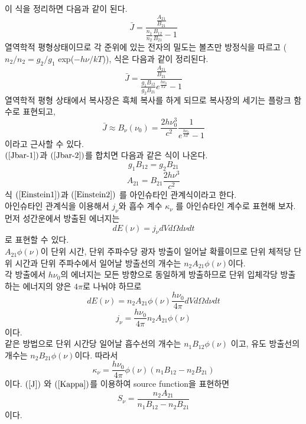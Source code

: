 이 식을 정리하면 다음과 같이 된다. 
\begin{equation}
\bar{J} = \frac{\frac{A_{21}}{B_{21}}}{\frac{n_1}{n_2}\frac{B_{12}}{B_{21}}-1}
\end{equation}
열역학적 평형상태이므로 각 준위에 있는 전자의 밀도는 볼츠만 방정식을 따르고 ($n_2/n_2 = g_2/g_1$ exp($-h\nu/kT$)), 식은 다음과 같이 정리된다. 
\begin{equation}
\bar{J} = \frac{\frac{A_{21}}{B_{21}}}{\frac{g_1 B_{12}}{g_2 B_{21}}e^{\frac{h \nu_0}{kT}}-1} \label{Jbar-1}
\end{equation}
열역학적 평형 상태에서 복사장은 흑체 복사를 하게 되므로 복사장의 세기는 플랑크 함수로 표현되고, 
\begin{equation}
\bar{J} \approx B_\nu (\nu_0) = \frac{2h\nu_0^3}{c^2} \frac{1}{e^{\frac{h\nu_0}{kT}}-1} \label{Jbar-2}
\end{equation}이라고 근사할 수 있다.\\
$(\ref{Jbar-1})$과 $(\ref{Jbar-2})$를 합치면 다음과 같은 식이 나온다. 
\begin{equation}
g_1 B_{12} = g_2 B_{21} \label{Einstein1}
\end{equation}
\begin{equation}
A_{21} = B_{21}\frac{2h\nu^3}{c^2}  \label{Einstein2}
\end{equation}
식 $(\ref{Einstein1})$과 $(\ref{Einstein2})$ 를 아인슈타인 관계식이라고 한다. \\
아인슈타인 관계식을 이용해서 $j_\nu$와 흡수 계수 $\kappa_\nu$ 를 아인슈타인 계수로 표현해 보자.\\
먼저 성간운에서 방출된 에너지는 
\begin{equation}
dE(\nu) = j_\nu dV d\Omega d\nu dt %
\end{equation}
로 표현할 수 있다. \\
$A_{21}\phi(\nu)$이 단위 시간, 단위 주파수당 광자 방출이 일어날 확률이므로 단위 체적당 단위 시간과 단위 주파수에서 일어날 방출선의 개수는 $n_2 A_{21} \phi(\nu)$이다. \\
각 방출에서 $h\nu_0$의 에너지는 모든 방향으로 동일하게 방출하므로 단위 입체각당 방출하는 에너지의 양은 $4\pi$로 나눠야 하므로\\
\begin{equation}
dE(\nu) = n_2 A_{21} \phi(\nu) \frac{h \nu_0}{4\pi} dV d\Omega d\nu dt %
\end{equation}
\begin{equation}
j_\nu = \frac{h\nu_0}{4\pi} n_2 A_{21} \phi(\nu) \label{J}
\end{equation}
이다. \\
같은 방법으로 단위 시간당 일어날 흡수선의 개수는 $n_1 B_{12} \phi(\nu)$ 이고, 유도 방출선의 개수는 $n_2 B_{21} \phi(\nu)$이다.
따라서 
\begin{equation}
\kappa_\nu = \frac{h \nu_0}{4\pi} \phi(\nu) (n_1B_{12} - n_2 B_{21}) \label{Kappa}
\end{equation}
이다.
$(\ref{J})$ 와 $(\ref{Kappa})$를 이용하여 source function을 표현하면 
\begin{equation}
S_\nu = \frac{n_2 A_{21}}{n_1 B_{12} - n_2 B_{21}}
\end{equation}
이다. \\

